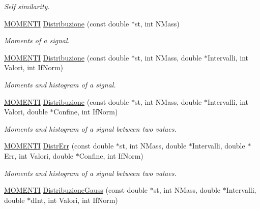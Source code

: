 \begin{DoxyCompactItemize}
\begin{DoxyCompactList}\small\item\em Self similarity. \end{DoxyCompactList}\item 
\hyperlink{structMOMENTI}{M\+O\+M\+E\+N\+TI} \hyperlink{classMatematica_a39b05b88f4b8ec478bd4da89c0e469d0}{Distribuzione} (const double $\ast$st, int N\+Mass)\hypertarget{classMatematica_a39b05b88f4b8ec478bd4da89c0e469d0}{}\label{classMatematica_a39b05b88f4b8ec478bd4da89c0e469d0}

\begin{DoxyCompactList}\small\item\em Moments of a signal. \end{DoxyCompactList}\item 
\hyperlink{structMOMENTI}{M\+O\+M\+E\+N\+TI} \hyperlink{classMatematica_a1ab633f13d7ee483931d6b17f9fb0164}{Distribuzione} (const double $\ast$st, int N\+Mass, double $\ast$Intervalli, int Valori, int If\+Norm)\hypertarget{classMatematica_a1ab633f13d7ee483931d6b17f9fb0164}{}\label{classMatematica_a1ab633f13d7ee483931d6b17f9fb0164}

\begin{DoxyCompactList}\small\item\em Moments and histogram of a signal. \end{DoxyCompactList}\item 
\hyperlink{structMOMENTI}{M\+O\+M\+E\+N\+TI} \hyperlink{classMatematica_a45b9e8e40b9d8107cbfdb92cec130ea3}{Distribuzione} (const double $\ast$st, int N\+Mass, double $\ast$Intervalli, int Valori, double $\ast$Confine, int If\+Norm)\hypertarget{classMatematica_a45b9e8e40b9d8107cbfdb92cec130ea3}{}\label{classMatematica_a45b9e8e40b9d8107cbfdb92cec130ea3}

\begin{DoxyCompactList}\small\item\em Moments and histogram of a signal between two values. \end{DoxyCompactList}\item 
\hyperlink{structMOMENTI}{M\+O\+M\+E\+N\+TI} \hyperlink{classMatematica_a5e8fb8fff251f8594af3f6ec809bdd46}{Distr\+Err} (const double $\ast$st, int N\+Mass, double $\ast$Intervalli, double $\ast$Err, int Valori, double $\ast$Confine, int If\+Norm)\hypertarget{classMatematica_a5e8fb8fff251f8594af3f6ec809bdd46}{}\label{classMatematica_a5e8fb8fff251f8594af3f6ec809bdd46}

\begin{DoxyCompactList}\small\item\em Moments and histogram of a signal between two values. \end{DoxyCompactList}\item 
\hyperlink{structMOMENTI}{M\+O\+M\+E\+N\+TI} \hyperlink{classMatematica_a558ecd17e8fec096693541f1d83545ae}{Distribuzione\+Gauss} (const double $\ast$st, int N\+Mass, double $\ast$Intervalli, double $\ast$d\+Int, int Valori, int If\+Norm)\hypertarget{classMatematica_a558ecd17e8fec096693541f1d83545ae}{}\label{classMatematica_a558ecd17e8fec096693541f1d83545ae}


\end{DoxyCompactItemize}
